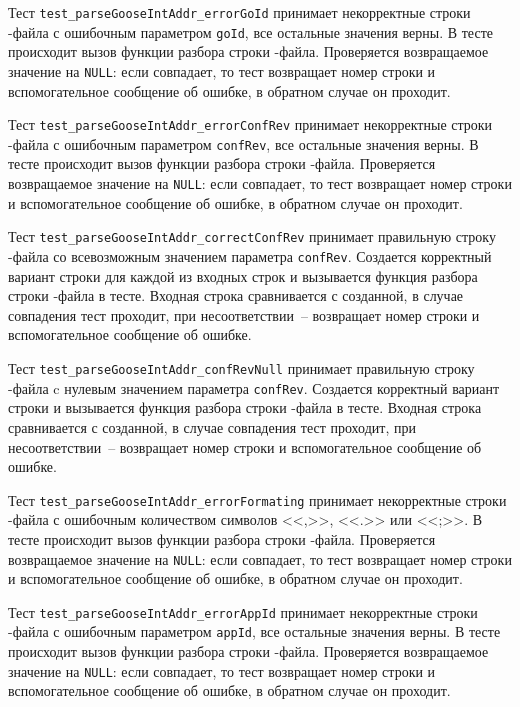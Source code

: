 Тест \lstinline{test_parseGooseIntAddr_errorGoId} принимает некорректные строки \cid-файла с ошибочным параметром \lstinline{goId}, все остальные значения верны. В тесте происходит вызов функции разбора строки \cid-файла. Проверяется возвращаемое значение на \lstinline{NULL}: если совпадает, то тест возвращает номер строки и вспомогательное сообщение об ошибке, в обратном случае он проходит.

Тест \lstinline{test_parseGooseIntAddr_errorConfRev} принимает некорректные строки \cid-файла с ошибочным параметром \lstinline{confRev}, все остальные значения верны. В тесте происходит вызов функции разбора строки \cid-файла. Проверяется возвращаемое значение на \lstinline{NULL}: если совпадает, то тест возвращает номер строки и вспомогательное сообщение об ошибке, в обратном случае он проходит.

Тест \lstinline{test_parseGooseIntAddr_correctConfRev} принимает правильную строку \cid-файла со всевозможным значением параметра \lstinline{confRev}. Создается корректный вариант строки для каждой из входных строк и вызывается функция разбора строки \cid-файла в тесте. Входная строка сравнивается с созданной, в случае совпадения тест проходит, при несоответствии~-- возвращает номер строки и вспомогательное сообщение  об ошибке.

Тест \lstinline{test_parseGooseIntAddr_confRevNull} принимает правильную строку \cid-файла c нулевым значением параметра \lstinline{confRev}. Создается корректный вариант строки и вызывается функция разбора строки \cid-файла в тесте. Входная строка сравнивается с созданной, в случае совпадения тест проходит, при несоответствии~-- возвращает номер строки и вспомогательное сообщение об ошибке.

Тест \lstinline{test_parseGooseIntAddr_errorFormating} принимает некорректные строки \cid-файла с ошибочным количеством символов <<,>>, <<.>> или <<;>>. В тесте происходит вызов функции разбора строки \cid-файла. Проверяется возвращаемое значение на \lstinline{NULL}: если совпадает, то тест возвращает номер строки и вспомогательное сообщение об ошибке, в обратном случае он проходит.

Тест \lstinline{test_parseGooseIntAddr_errorAppId} принимает некорректные строки \cid-файла с ошибочным параметром \lstinline{appId}, все остальные значения верны. В тесте происходит вызов функции разбора строки \cid-файла. Проверяется возвращаемое значение на \lstinline{NULL}: если совпадает, то тест возвращает номер строки и вспомогательное сообщение об ошибке, в обратном случае он проходит.

